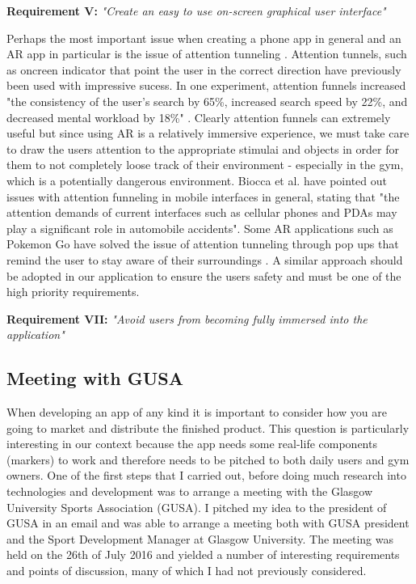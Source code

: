 \documentclass{l4proj}
\begin{document}
\textbf{Requirement V:} \textit{"Create an easy to use on-screen graphical user interface"}   \label{requirement_V}


Perhaps the most important issue when creating a phone app in general and an AR app in particular is the issue of attention tunneling \cite{radu_why_2012} \cite{biocca_attention_2007}. Attention tunnels, such as oncreen indicator that point the user in the correct direction have previously been used with impressive sucess\cite{biocca_attention_2007}. In one experiment, attention funnels increased "the consistency of the user’s search by 65\%,  increased search speed by 22\%, and decreased mental workload by 18\%" \cite{biocca_attention_2007}. Clearly attention funnels can extremely useful but since using AR is a relatively immersive experience, we must take care to draw the users attention to the appropriate stimulai and objects in order for them to not completely loose track of their environment - especially in the gym, which is a potentially dangerous environment. Biocca et al. have pointed out issues with attention funneling in mobile interfaces in general, stating that "the attention demands of current interfaces such as cellular phones and PDAs may play a significant role in automobile accidents". Some AR applications such as Pokemon Go have solved the issue of attention tunneling through pop ups that remind the user to stay aware of their surroundings \cite{hollister_drivers_2016}. A similar approach should be adopted in our application to ensure the users safety and must be one of the high priority requirements.

\textbf{Requirement VII:} \textit{"Avoid users from becoming fully immersed into the application"}  \label{requirement_VI}


\subsection{Meeting with GUSA}
When developing an app of any kind it is important to consider how you are going to market and distribute the finished product. This question is particularly interesting in our context because the app needs some real-life components (markers) to work and therefore needs to be pitched to both daily users and gym owners. One of the first steps that I carried out, before doing much research into technologies and development was to arrange a meeting with the Glasgow University Sports Association (GUSA). I pitched my idea to the president of GUSA in an email and was able to arrange a meeting both with GUSA president and the Sport Development Manager at Glasgow University. The meeting 	was held on the 26th of July 2016 and yielded a number of interesting requirements and points of discussion, many of which I had not previously considered. 
\end{document}
